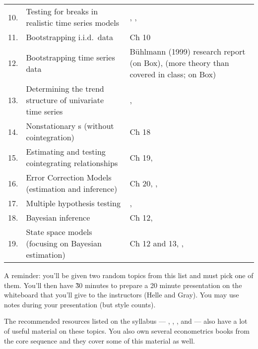 \documentclass[nofonts,nols]{tufte-handout}
\renewcommand{\allcaps}[1]{\textls{\MakeUppercase{#1}}}
\newcommand{\VAR}{\allcaps{VAR}}
\begin{document}
\begin{table*}[h]
\begin{tabularx}{\textwidth}{rXX}
    10. & Testing for breaks in realistic time series models                     & \citep{An03}, \citep{Ba97}, \citep{BP98}                                                                \\
    11. & Bootstrapping i.i.d.\ data                                             & \citep{Ha14} Ch 10                                                                                      \\
    12. & Bootstrapping time series data                                         & B\"{u}hlmann (1999) research report (on Box), \citep{HHK03} (more theory than covered in class; on Box) \\
    13. & Determining the trend structure of univariate time series              & \citep{AB00}, \citep{HLT07}                                                                             \\
    14. & Nonstationary \VAR s (without cointegration)                           & \citep{Ha94} Ch 18                                                                                      \\
    15. & Estimating and testing cointegrating relationships                     & \citep{Ha94} Ch 19,  \citep{Jo14}                                                                       \\
    16. & Error Correction Models (estimation and inference)                     & \citep{Ha94} Ch 20, \citep{Da13}, \citep{Jo14}                                                          \\
    17. & Multiple hypothesis testing                                            & \citep{RW05}, \citep{Ro08}                                                                              \\
    18. & Bayesian inference                                                     & \citep{Ha94} Ch 12, \citep{Ch12}                                                                        \\
    19. & State space models (focusing on Bayesian estimation)                   & \citep{Ha94} Ch 12 and 13, \citep{Fe11}, \citep{Ch12}                                                   \\
    \bottomrule
  \end{tabularx}
\end{table*}

\begin{fullwidth}
\noindent%
A reminder: you'll be given two random topics from this list and must
pick one of them. You'll then have \~30 minutes to prepare a 20 minute
presentation on the whiteboard that you'll give to the instructors
(Helle and Gray). You may use notes during your presentation (but
style counts).

The recommended resources listed on the syllabus --- \citep{Lu06},
\citep{Ca07}, \citep{MS08}, and \citep{SW08} --- also have a lot of
useful material on these topics. You also own several econometrics
books from the core sequence and they cover some of this material as
well.



\end{fullwidth}
\end{document}
